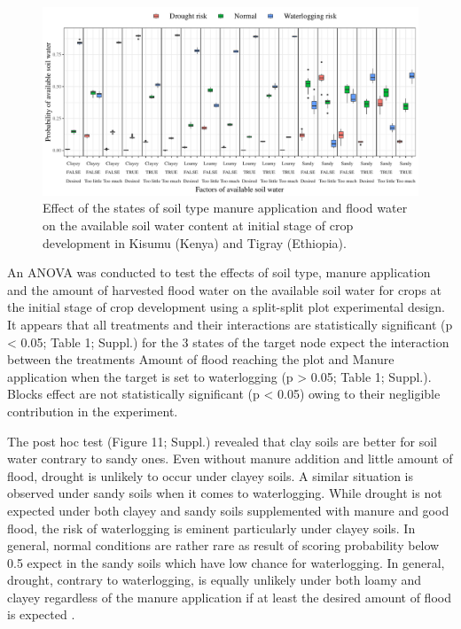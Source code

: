 \documentclass[12pt,oneside]{article}
\begin{document}
\begin{figure}
\centering
\includegraphics{Modelling_FBFS_files/figure-latex/figure_6-1.pdf}
\caption{\label{figures:figure_6}Effect of the states of soil type
manure application and flood water on the available soil water content
at initial stage of crop development in Kisumu (Kenya) and Tigray
(Ethiopia).}
\end{figure}

An ANOVA was conducted to test the effects of soil type, manure
application and the amount of harvested flood water on the available
soil water for crops at the initial stage of crop development using a
split-split plot experimental design. It appears that all treatments and
their interactions are statistically significant (p \textless{} 0.05;
Table 1; Suppl.) for the 3 states of the target node expect the
interaction between the treatments Amount of flood reaching the plot and
Manure application when the target is set to waterlogging (p
\textgreater{} 0.05; Table 1; Suppl.). Blocks effect are not
statistically significant (p \textless{} 0.05) owing to their negligible
contribution in the experiment.

The post hoc test (Figure 11; Suppl.) revealed that clay soils are
better for soil water contrary to sandy ones. Even without manure
addition and little amount of flood, drought is unlikely to occur under
clayey soils. A similar situation is observed under sandy soils when it
comes to waterlogging. While drought is not expected under both clayey
and sandy soils supplemented with manure and good flood, the risk of
waterlogging is eminent particularly under clayey soils. In general,
normal conditions are rather rare as result of scoring probability below
0.5 expect in the sandy soils which have low chance for waterlogging. In
general, drought, contrary to waterlogging, is equally unlikely under
both loamy and clayey regardless of the manure application if at least
the desired amount of flood is expected .
\end{document}
